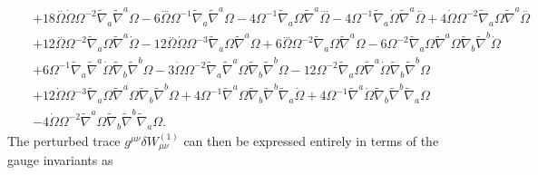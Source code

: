 \documentclass[10pt,letterpaper]{article}
\numberwithin{equation}{section}
\begin{document}
\begin{eqnarray}
&& + 18 \overset{..}{\Omega} \dot{\Omega} \Omega^{-2} \tilde{\nabla}_{a}\tilde{\nabla}^{a}\Omega - 6 \overset{...}{\Omega} \Omega^{-1} \tilde{\nabla}_{a}\tilde{\nabla}^{a}\Omega - 4 \Omega^{-1} \tilde{\nabla}_{a}\Omega \tilde{\nabla}^{a}\overset{...}{\Omega} - 4 \Omega^{-1} \tilde{\nabla}_{a}\dot{\Omega} \tilde{\nabla}^{a}\overset{..}{\Omega} + 4 \dot{\Omega} \Omega^{-2} \tilde{\nabla}_{a}\Omega \tilde{\nabla}^{a}\overset{..}{\Omega} \nonumber \\ 
&& + 12 \overset{..}{\Omega} \Omega^{-2} \tilde{\nabla}_{a}\Omega \tilde{\nabla}^{a}\dot{\Omega} - 12 \overset{..}{\Omega} \dot{\Omega} \Omega^{-3} \tilde{\nabla}_{a}\Omega \tilde{\nabla}^{a}\Omega + 6 \overset{...}{\Omega} \Omega^{-2} \tilde{\nabla}_{a}\Omega \tilde{\nabla}^{a}\Omega - 6 \Omega^{-2} \tilde{\nabla}_{a}\Omega \tilde{\nabla}^{a}\Omega \tilde{\nabla}_{b}\tilde{\nabla}^{b}\dot{\Omega} \nonumber \\ 
&& + 6 \Omega^{-1} \tilde{\nabla}_{a}\tilde{\nabla}^{a}\dot{\Omega} \tilde{\nabla}_{b}\tilde{\nabla}^{b}\Omega - 3 \dot{\Omega} \Omega^{-2} \tilde{\nabla}_{a}\tilde{\nabla}^{a}\Omega \tilde{\nabla}_{b}\tilde{\nabla}^{b}\Omega - 12 \Omega^{-2} \tilde{\nabla}_{a}\Omega \tilde{\nabla}^{a}\dot{\Omega} \tilde{\nabla}_{b}\tilde{\nabla}^{b}\Omega \nonumber \\ 
&& + 12 \dot{\Omega} \Omega^{-3} \tilde{\nabla}_{a}\Omega \tilde{\nabla}^{a}\Omega \tilde{\nabla}_{b}\tilde{\nabla}^{b}\Omega + 4 \Omega^{-1} \tilde{\nabla}^{a}\Omega \tilde{\nabla}_{b}\tilde{\nabla}^{b}\tilde{\nabla}_{a}\dot{\Omega} + 4 \Omega^{-1} \tilde{\nabla}^{a}\dot{\Omega} \tilde{\nabla}_{b}\tilde{\nabla}^{b}\tilde{\nabla}_{a}\Omega \nonumber \\ 
&& - 4 \dot{\Omega} \Omega^{-2} \tilde{\nabla}^{a}\Omega \tilde{\nabla}_{b}\tilde{\nabla}^{b}\tilde{\nabla}_{a}\Omega.
\end{eqnarray}
The perturbed trace $g^{\mu\nu} \delta W^{(1)}_{\mu\nu}$ can then be expressed entirely in terms of the gauge invariants as
\end{document}
